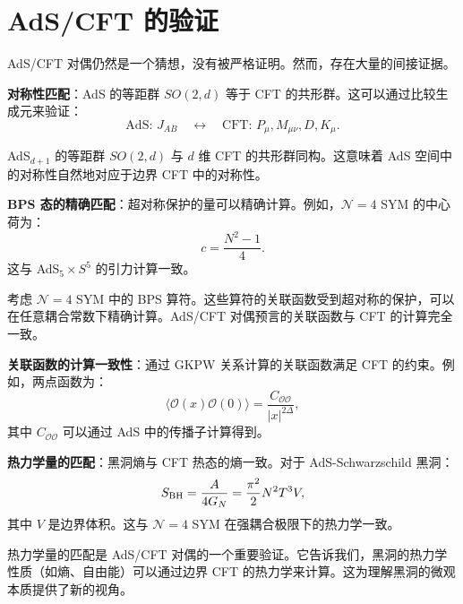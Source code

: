 \section{AdS/CFT 的验证}

AdS/CFT 对偶仍然是一个猜想，没有被严格证明。然而，存在大量的间接证据。

\textbf{对称性匹配}：AdS 的等距群 $SO(2,d)$ 等于 CFT 的共形群。这可以通过比较生成元来验证：
\begin{equation}
    \text{AdS: } J_{AB} \quad \longleftrightarrow \quad \text{CFT: } P_\mu, M_{\mu\nu}, D, K_\mu.
\end{equation}

\begin{theorem}[对称性匹配]
AdS$_{d+1}$ 的等距群 $SO(2,d)$ 与 $d$ 维 CFT 的共形群同构。这意味着 AdS 空间中的对称性自然地对应于边界 CFT 中的对称性。
\end{theorem}

\textbf{BPS 态的精确匹配}：超对称保护的量可以精确计算。例如，$\mathcal{N}=4$ SYM 的中心荷为：
\begin{equation}
    c = \frac{N^2 - 1}{4}.
\end{equation}
这与 AdS$_5 \times S^5$ 的引力计算一致。

\begin{example}
考虑 $\mathcal{N}=4$ SYM 中的 BPS 算符。这些算符的关联函数受到超对称的保护，可以在任意耦合常数下精确计算。AdS/CFT 对偶预言的关联函数与 CFT 的计算完全一致。
\end{example}

\textbf{关联函数的计算一致性}：通过 GKPW 关系计算的关联函数满足 CFT 的约束。例如，两点函数为：
\begin{equation}
    \langle \mathcal{O}(x) \mathcal{O}(0) \rangle = \frac{C_{\mathcal{O}\mathcal{O}}}{|x|^{2\Delta}},
\end{equation}
其中 $C_{\mathcal{O}\mathcal{O}}$ 可以通过 AdS 中的传播子计算得到。

\textbf{热力学量的匹配}：黑洞熵与 CFT 热态的熵一致。对于 AdS-Schwarzschild 黑洞：
\begin{equation}
    S_{\rm BH} = \frac{A}{4G_N} = \frac{\pi^2}{2} N^2 T^3 V,
\end{equation}
其中 $V$ 是边界体积。这与 $\mathcal{N}=4$ SYM 在强耦合极限下的热力学一致。

\begin{remark}[热力学量匹配的意义]
热力学量的匹配是 AdS/CFT 对偶的一个重要验证。它告诉我们，黑洞的热力学性质（如熵、自由能）可以通过边界 CFT 的热力学来计算。这为理解黑洞的微观本质提供了新的视角。
\end{remark}

